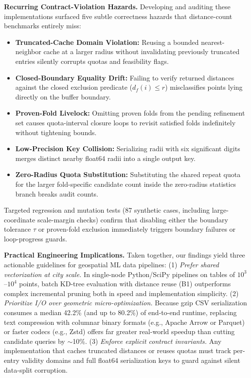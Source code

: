 \documentclass[sigconf, nonacm]{acmart}
\begin{document}
\textbf{Recurring Contract-Violation Hazards.} Developing and auditing these implementations surfaced five subtle correctness hazards that distance-count benchmarks entirely miss:
\begin{itemize}
\item \textbf{Truncated-Cache Domain Violation:} Reusing a bounded nearest-neighbor cache at a larger radius without invalidating previously truncated entries silently corrupts quotas and feasibility flags.
\item \textbf{Closed-Boundary Equality Drift:} Failing to verify returned distances against the closed exclusion predicate ($d_f(i)\le r$) misclassifies points lying directly on the buffer boundary.
\item \textbf{Proven-Fold Livelock:} Omitting proven folds from the pending refinement set causes quota-interval closure loops to revisit satisfied folds indefinitely without tightening bounds.
\item \textbf{Low-Precision Key Collision:} Serializing radii with six significant digits merges distinct nearby float64 radii into a single output key.
\item \textbf{Zero-Radius Quota Substitution:} Substituting the shared repeat quota for the larger fold-specific candidate count inside the zero-radius statistics branch breaks audit counts.
\end{itemize}
Targeted regression and mutation tests (87 synthetic cases, including large-coordinate scale-margin checks) confirm that disabling either the boundary tolerance $\tau$ or proven-fold exclusion immediately triggers boundary failures or loop-progress guards.

\textbf{Practical Engineering Implications.} Taken together, our findings yield three actionable guidelines for geospatial ML data pipelines: (1) \emph{Prefer shared vectorization at city scale.} In single-node Python/SciPy pipelines on tables of $10^3$--$10^4$ points, batch KD-tree evaluation with distance reuse (B1) outperforms complex incremental pruning both in speed and implementation simplicity. (2) \emph{Prioritize I/O over geometric micro-optimization.} Because gzip CSV serialization consumes a median 42.2\% (and up to 80.2\%) of end-to-end runtime, replacing text compression with columnar binary formats (e.g., Apache Arrow or Parquet) or faster codecs (e.g., Zstd) offers far greater real-world speedup than cutting candidate queries by $\sim$10\%. (3) \emph{Enforce explicit contract invariants.} Any implementation that caches truncated distances or reuses quotas must track per-entry validity domains and full float64 serialization keys to guard against silent data-split corruption.
\end{document}
